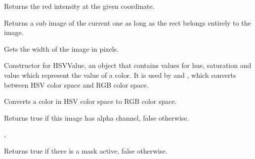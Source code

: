 Returns the red intensity at the given coordinate.


\label{wximagegetsubimage}


Returns a sub image of the current one as long as the rect belongs entirely to
the image.


\label{wximagegetwidth}


Gets the width of the image in pixels.




\label{hsvvaluehsvvalue}


Constructor for HSVValue, an object that contains values for hue, saturation and value which
represent the value of a color. It is used by 
and , which
converts between HSV color space and RGB color space.




\label{wximagehsvtorgb}


Converts a color in HSV color space to RGB color space.


\label{wximagehasalpha}


Returns true if this image has alpha channel, false otherwise.


, 


\label{wximagehasmask}


Returns true if there is a mask active, false otherwise.


\label{wximagegetoption}

